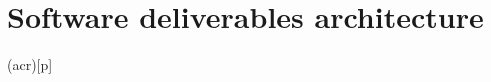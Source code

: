 \documentclass[a4paper,twoside,openright,makeidx,12pt]{book}
\begin{document}
\newpage
\chapter{Software deliverables architecture}
\label{Sec:DDD-SoftwareDeliverablesArchitecture}



%


\newpage


\printglosstex(acr)[p]


\cleardoublepage
%
%
\end{document}
